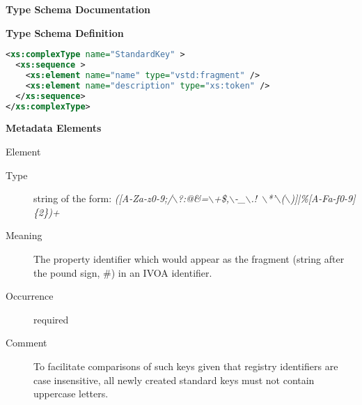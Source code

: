 \documentclass[11pt,a4paper]{ivoa}
\begin{document}
\begin{generated}
\begingroup
        \renewcommand*\descriptionlabel[1]{%
        \hbox to 5.5em{\emph{#1}\hfil}}\vspace{2ex}\noindent\textbf{ Type Schema Documentation}




\vspace{1ex}\noindent\textbf{ Type Schema Definition}

\begin{lstlisting}[language=XML,basicstyle=\footnotesize]
<xs:complexType name="StandardKey" >
  <xs:sequence >
    <xs:element name="name" type="vstd:fragment" />
    <xs:element name="description" type="xs:token" />
  </xs:sequence>
</xs:complexType>
\end{lstlisting}

\vspace{0.5ex}\noindent\textbf{ Metadata Elements}

\begingroup\small\begin{bigdescription}\item[Element \xmlel{name}]
\begin{description}
\item[Type] string of the form: \emph{([A-Za-z0-9;/$\backslash$?:@\&=$\backslash$+\$,$\backslash$-\_$\backslash$.!~$\backslash$*'$\backslash$($\backslash$)]|\%[A-Fa-f0-9]\{2\})+}
\item[Meaning]
                  The property identifier which would appear as the
                  fragment (string after the pound sign, \#) in an IVOA
                  identifier.

\item[Occurrence] required

\item[Comment]
                  To facilitate comparisons of such keys given that
                  registry identifiers are case insensitive, all newly
                  created standard keys must not contain uppercase letters.



\end{description}
\end{bigdescription}
\end{generated}
\end{document}
